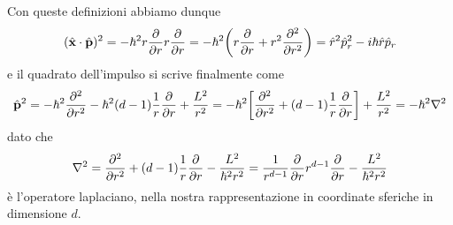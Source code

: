 Con queste definizioni abbiamo dunque
\begin{equation}
	({\hat{\mathbf{x}}}\cdot{\hat{\mathbf{p}}})^2=-\hbar^2r\frac{\partial {}}{\partial {r}}r\frac{\partial {}}{\partial {r}}=-\hbar^2\bigg(r\frac{\partial {}}{\partial {r}}+r^2\frac{\partial^2 {}}{\partial {r}^2}\bigg)=\hat{r}^2\hat{p}_r^2-i\hbar \hat{r}\hat{p}_r
\end{equation}
e il quadrato dell'impulso si scrive finalmente come
\begin{equation}
	\hat{\mathbf{p}}^2=-\hbar^2\frac{\partial^2 {}}{\partial {r}^2}-\hbar^2(d-1)\frac1{r}\frac{\partial {}}{\partial {r}}+\frac{L^2}{r^2}=
	-\hbar^2\bigg[\frac{\partial^2 {}}{\partial {r}^2}+(d-1)\frac1{r}\frac{\partial {}}{\partial {r}}\bigg]+\frac{L^2}{r^2}=
	-\hbar^2\nabla^2
\end{equation}
dato che
\begin{equation}
	\nabla^2=\frac{\partial^2 {}}{\partial {r}^2}+(d-1)\frac1{r}\frac{\partial {}}{\partial {r}}-\frac{L^2}{\hbar^2r^2}=
	\frac1{r^{d-1}}\frac{\partial {}}{\partial {r}}r^{d-1}\frac{\partial {}}{\partial {r}}-\frac{L^2}{\hbar^2r^2}
\end{equation}
è l'operatore laplaciano, nella nostra rappresentazione in coordinate sferiche in dimensione $d$.

